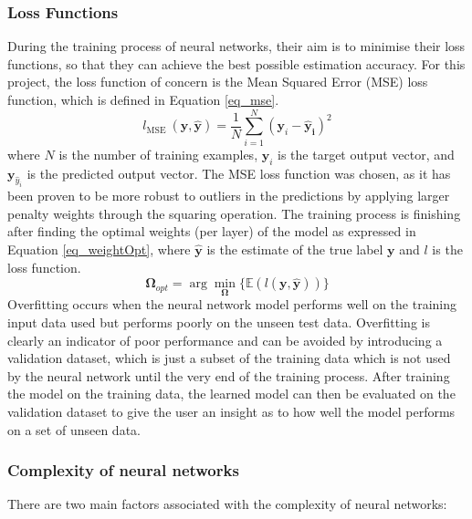  \subsubsection{Loss Functions}
 During the training process of neural networks, their aim is to minimise their loss functions, so that they can achieve the best possible estimation accuracy. For this project, the loss function of concern is the Mean Squared Error (MSE) loss function, which is defined in 
Equation \ref{eq_mse}.
\begin{equation}\label{eq_mse}
    l_\text{MSE }(\mathbf{y}, \mathbf{\hat{y}}) = \frac{1}{N} \sum_{i=1}^N (\mathbf{y}_i - \mathbf{\hat{y}_i})^2
\end{equation}\noindent where $N$ is the number of training examples, $\mathbf{y}_i$ is the target output vector, and $\mathbf{y}_{\hat{y}_i}$ is the predicted output vector. The MSE loss function was chosen, as it has been proven to be more robust to outliers in the predictions by applying larger penalty weights through the squaring operation. The training 
process is finishing after finding the optimal weights (per layer) of the model as expressed in Equation \ref{eq_weightOpt}, where $\mathbf{\hat{y}}$ is the estimate of
 the true label $\mathbf{y}$ and $l$ is the loss function.
 \begin{equation}\label{eq_weightOpt}
    \mathbf{\Omega}_{opt} = \arg \min_{\mathbf{\Omega}} \{\mathbb{E}(l(\mathbf{y}, \mathbf{\hat{y}}))\}
 \end{equation}\noindent Overfitting occurs when the neural network model performs well on the training input data used 
 but performs poorly on the unseen test data. Overfitting is clearly an indicator 
 of poor performance and can be avoided by introducing a validation dataset, which 
 is just a subset of the training data which is not used by the neural network until the very end 
 of the training process. After training the model on the training data, the learned model can then be 
 evaluated on the validation dataset to give the user an insight as to how well 
 the model performs on a set of unseen data.
 
 \subsubsection{Complexity of neural networks}
 There are two main factors associated with the complexity of neural networks:

